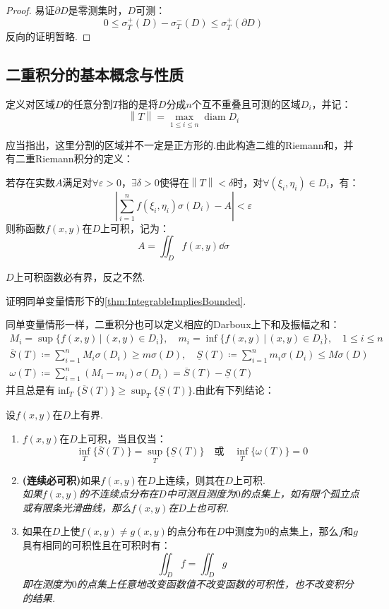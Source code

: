\begin{proof}
    易证$\partial D$是零测集时，$D$可测：
    \[0 \leqslant \sigma_T^+(D) - \sigma_T^-(D) \leqslant \sigma_T^+(\partial D)\]
    反向的证明暂略.
\end{proof}


\subsection{二重积分的基本概念与性质}
\begin{definition}
    定义对区域$D$的任意分割$T$指的是将$D$分成$n$个互不重叠且可测的区域$D_i$，并记：
    \[\left\|T\right\| = \max_{1\leqslant i \leqslant n}\operatorname{diam}D_i\]
\end{definition}
应当指出，这里分割的区域并不一定是正方形的.由此构造二维的Riemann和，并有二重Riemann积分的定义：
\begin{definition}
    若存在实数$A$满足对$\forall \varepsilon > 0$，$\exists\delta>0$使得在$\left\|T\right\|<\delta$时，对$\forall(\xi_i,\eta_i)\in D_i$，有：
    \[\left|\sum_{i=1}^{n}f(\xi_i,\eta_i)\sigma(D_i) - A\right|<\varepsilon\]
    则称函数$f(x,y)$在$D$上可积，记为：
    \[A = \iint_D f(x,y)\dd{\sigma}\]
\end{definition}

\begin{theorem}
    $D$上可积函数必有界，反之不然.
\end{theorem}
证明同单变量情形下的\cref{thm:IntegrableImpliesBounded}.

同单变量情形一样，二重积分也可以定义相应的Darboux上下和及振幅之和：
\begin{gather*}
    M_i = \sup\{f(x,y)\,|\,(x,y)\in D_i\},\quad m_i = \inf\{f(x,y)\,|\,(x,y)\in D_i\},\quad 1\leqslant i \leqslant n \\
    \overline{S}(T) \coloneq \sum_{i=1}^{n}M_i\sigma(D_i) \geqslant m \sigma(D),\quad \underline{S}(T) \coloneq \sum_{i=1}^{n}m_i\sigma(D_i) \leqslant M\sigma(D) \\
    \omega(T) \coloneq \sum_{i=1}^{n}(M_i - m_i)\sigma(D_i) = \overline{S}(T) - \underline{S}(T)
\end{gather*}
并且总是有$\displaystyle\inf_T\{\overline{S}(T)\} \geqslant \sup_T\{\underline{S}(T)\}$.由此有下列结论：
\begin{theorem}
    设$f(x,y)$在$D$上有界.
    \begin{enumerate}[circ]
        \item $f(x,y)$在$D$上可积，当且仅当：
        \[\inf_T\{\overline{S}(T)\} = \sup_T\{\underline{S}(T)\} \quad\text{或}\quad \inf_T\{\omega(T)\} = 0\]
        \item \textbf{(连续必可积)}如果$f(x,y)$在$D$上连续，则其在$D$上可积.\\
        \textit{如果$f(x,y)$的不连续点分布在$D$中可测且测度为$0$的点集上，如有限个孤立点或有限条光滑曲线，那么$f(x,y)$在$D$上也可积.}
        \item 如果在$D$上使$f(x,y) \neq g(x,y)$的点分布在$D$中测度为$0$的点集上，那么$f$和$g$具有相同的可积性且在可积时有：
        \[\iint_D f = \iint_D g\]
        \textit{即在测度为$0$的点集上任意地改变函数值不改变函数的可积性，也不改变积分的结果.}
    \end{enumerate}
\end{theorem}

